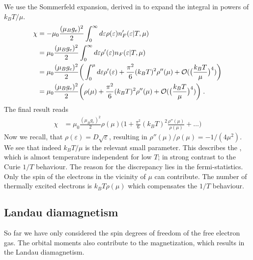 We use the Sommerfeld expansion, derived in  to expand the integral in powers of $k_{B}T/\mu$. 
%
\begin{align*}
\chi &=-\mu_{0}\frac{(\mu_{B}g_{e})^{2} }{2}  \int_{0}^{\infty}d\varepsilon \rho(\varepsilon)  n'_{F}(\varepsilon|T,\mu)\notag\\
&=\mu_{0}\frac{(\mu_{B}g_{e})^{2} }{2}  \int_{0}^{\infty}d\varepsilon \rho'(\varepsilon)  n_{F}(\varepsilon|T,\mu)\\
 &=\mu_{0}\frac{(\mu_{B}g_{e})^{2} }{2}  \bigg(\int_{0}^{\mu}d\varepsilon \rho'(\varepsilon)
+\frac{\pi^{2}}{6}(k_{B}T)^{2}\rho''(\mu)+ {\cal O}(\big(\frac{k_{B}T}{\mu}\big)^{4})
 \bigg)\\    
  &=\mu_{0}\frac{(\mu_{B}g_{e})^{2} }{2}  \bigg( \rho(\mu)
+\frac{\pi^{2}}{6}(k_{B}T)^{2}\rho''(\mu)+ {\cal O}(\big(\frac{k_{B}T}{\mu}\big)^{4})
 \bigg)\;.
\end{align*}
%
The final result reads
%
\begin{align}\label{eq:para:chi}
\chi   &=\mu_{0}\frac{(\mu_{B}g_{e})^{2} }{2}  \rho(\mu)\bigg( 1
+\frac{\pi^{2}}{6}(k_{B}T)^{2}\frac{\rho''(\mu)}{\rho(\mu)}+\ldots
 \bigg)
\end{align}
%
Now we recall, that $\rho(\varepsilon) = D \sqrt{\varepsilon}$, resulting in
$\rho''(\mu)/\rho(\mu)=-1/(4\mu^{2})$. 
%
%
We see that indeed $k_{B}T/\mu$ is the relevant small parameter.
This describes the , which is almost temperature
independent for low $T$; in strong contrast to the Curie $1/T$ behaviour.
The reason for the discrepancy lies in the fermi-statistics. Only the spin of the electrons in the vicinity of $\mu$ can contribute. The number of thermally excited electrons
is $k_{B} T \rho(\mu)$ which compensates the $1/T$ behaviour.


\subsection{Landau diamagnetism}
So far we have only considered the spin degrees of freedom of the free electron gas. The orbital moments also contribute to the magnetization, which results in the Landau diamagnetism.

